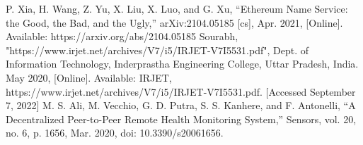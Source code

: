\documentclass{article}
\begin{document}
P. Xia, H. Wang, Z. Yu, X. Liu, X. Luo, and G. Xu, “Ethereum Name Service: the Good, the Bad, and the Ugly,” arXiv:2104.05185 [cs], Apr. 2021, [Online]. Available: https://arxiv.org/abs/2104.05185
\newline\newline
Sourabh, "https://www.irjet.net/archives/V7/i5/IRJET-V7I5531.pdf", Dept. of Information Technology, Inderprastha Engineering College, Uttar Pradesh, India. May 2020, [Online]. Available: IRJET, https://www.irjet.net/archives/V7/i5/IRJET-V7I5531.pdf. [Accessed September 7, 2022]
\newline\newline
M. S. Ali, M. Vecchio, G. D. Putra, S. S. Kanhere, and F. Antonelli, “A Decentralized Peer-to-Peer Remote Health Monitoring System,” Sensors, vol. 20, no. 6, p. 1656, Mar. 2020, doi: 10.3390/s20061656. 
\end{document}
